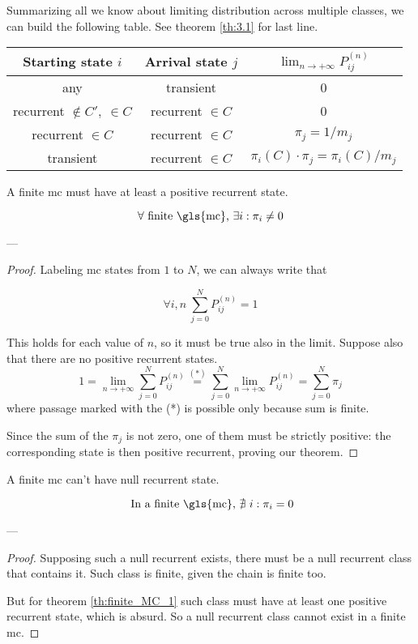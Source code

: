 	\bigbreak
	Summarizing all we know about limiting distribution across multiple classes, we can build the following table.
	See theorem \ref{th:3.1} for last line.
	\begin{center}\begin{tabular}{c c c}
		\toprule
		Starting state $i$ & Arrival state $j$ & $\lim_{n \to +\infty}
		P_{ij}^{(n)}$ \\
		\midrule
		any & transient & 0 \\
		recurrent $\notin C' ,\: \in C$ & recurrent $\in C$ & 0 \\
		recurrent $\in C$ & recurrent $\in C$ & $\pi_j = 1 / m_j$ \\
		transient & recurrent $\in C$ & $\pi_i(C)\cdot\pi_j = \pi_i(C) / m_j$ \\
		\bottomrule
	\end{tabular}\end{center}

	\begin{theorem} \label{th:finite_MC_1}
		A finite \gls{mc} must have at least a positive recurrent state.

		$$ \forall \text{ finite \gls{mc}, } \exists i: \pi_i \neq 0 $$
	\end{theorem}
	---
	\begin{proof}
		Labeling \gls{mc} states from $1$ to $N$, we can always write that

		$$ \forall i, n ~ \sum_{j=0}^N P_{ij}^{(n)} = 1$$

		This holds for each value of $n$, so it must be true also in the limit.
		Suppose also that there are no positive recurrent states.
		$$ 1 = \lim_{n \to +\infty} \sum_{j=0}^N P_{ij}^{(n)} \stackrel{(*)}{=} \sum_{j=0}^N \lim_{n \to +\infty} P_{ij}^{(n)}
		= \sum_{j=0}^N \pi_j $$
		where passage marked with the (*) is possible only because sum is finite.

		Since the sum of the $\pi_j$ is not zero, one of them must be strictly positive: the corresponding state is then positive recurrent, proving our theorem.
	\end{proof}

	\begin{theorem}
		A finite \gls{mc} can't have null recurrent state.

		$$ \text{ In a finite \gls{mc}, } \nexists~ i: \pi_i = 0 $$
	\end{theorem}
	---
	\begin{proof}
		Supposing such a null recurrent exists, there must be a null recurrent class that contains it.
		Such class is finite, given the chain is finite too.

		But for theorem \ref{th:finite_MC_1} such class must have at least one positive recurrent state, which is absurd.
		So a null recurrent class cannot exist in a finite \gls{mc}.
	\end{proof}

